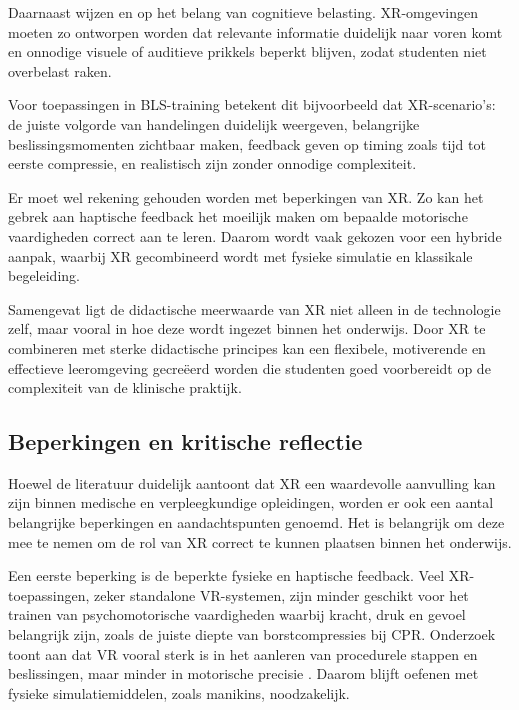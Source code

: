 Daarnaast wijzen \textcite{Fowler2015VR} en \textcite{Mayer2009Multimedia} op het belang van cognitieve belasting. XR-omgevingen moeten zo ontworpen worden dat relevante informatie duidelijk naar voren komt en onnodige visuele of auditieve prikkels beperkt blijven, zodat studenten niet overbelast raken.

Voor toepassingen in BLS-training betekent dit bijvoorbeeld dat XR-scenario’s:
de juiste volgorde van handelingen duidelijk weergeven, belangrijke beslissingsmomenten zichtbaar maken, feedback geven op timing zoals tijd tot eerste compressie, en realistisch zijn zonder onnodige complexiteit.

Er moet wel rekening gehouden worden met beperkingen van XR. Zo kan het gebrek aan haptische feedback het moeilijk maken om bepaalde motorische vaardigheden correct aan te leren. Daarom wordt vaak gekozen voor een hybride aanpak, waarbij XR gecombineerd wordt met fysieke simulatie en klassikale begeleiding.

Samengevat ligt de didactische meerwaarde van XR niet alleen in de technologie zelf, maar vooral in hoe deze wordt ingezet binnen het onderwijs. Door XR te combineren met sterke didactische principes kan een flexibele, motiverende en effectieve leeromgeving gecreëerd worden die studenten goed voorbereidt op de complexiteit van de klinische praktijk.

\subsection{Beperkingen en kritische reflectie}

Hoewel de literatuur duidelijk aantoont dat XR een waardevolle aanvulling kan zijn binnen medische en verpleegkundige opleidingen, worden er ook een aantal belangrijke beperkingen en aandachtspunten genoemd. Het is belangrijk om deze mee te nemen om de rol van XR correct te kunnen plaatsen binnen het onderwijs.

Een eerste beperking is de beperkte fysieke en haptische feedback. Veel XR-toepassingen, zeker standalone VR-systemen, zijn minder geschikt voor het trainen van psychomotorische vaardigheden waarbij kracht, druk en gevoel belangrijk zijn, zoals de juiste diepte van borstcompressies bij CPR. Onderzoek toont aan dat VR vooral sterk is in het aanleren van procedurele stappen en beslissingen, maar minder in motorische precisie \autocite{Alaker2016VR}. Daarom blijft oefenen met fysieke simulatiemiddelen, zoals manikins, noodzakelijk.

